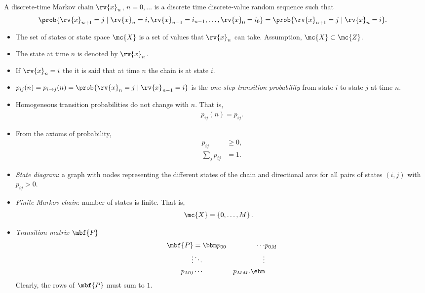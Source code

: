 \begin{definitionBox}
    A discrete-time Markov chain  $\rv{x}_{n}$, $n=0,\ldots$ is a discrete time discrete-value random sequence such that
    \begin{align}
        \prob{\rv{x}_{n+1}=j\mid \rv{x}_{n}=i,\rv{x}_{n-1}=i_{n-1},\ldots, \rv{x}_{0}=i_{0}} &=
        \prob{\rv{x}_{n+1}=j\mid \rv{x}_{n}=i}.
    \end{align}
\end{definitionBox}
\begin{remarkBox}[Terminology]
    \begin{itemize}
        \item The set of states or state space $\mc{X}$ is a set of values that $\rv{x}_{n}$ can take. Assumption, $\mc{X}\subset\mc{Z}$.
        \item The state at time $n$ is denoted by $\rv{x}_{n}$.
        \item If $\rv{x}_{n}=i$ the it is said that at time $n$ the chain is at state $i$.

        \item $p_{ij}(n)=p_{i\to j}(n) = \prob{\rv{x}_{n}=j\mid \rv{x}_{n-1}=i}$ is the \emph{one-step transition probability} from state $i$ to state $j$ at time $n$.
        \item Homogeneous transition probabilities do not change with $n$. That is,
        \begin{align}
            p_{ij}(n) = p_{ij}.
        \end{align}
        \item From the axioms of probability,
        \begin{align}
            p_{ij}&\geq 0, \\
            \sum_{j} p_{ij} &= 1.
        \end{align}
        \item \emph{State diagram}: a graph with nodes representing the different states of the chain and directional arcs for all pairs of states $(i,j)$ with $p_{ij}>0$.
        \item \emph{Finite Markov chain}: number of states is finite. That is,
        \begin{align}
            \mc{X} &= \left\{ 0, \ldots, M \right\}.
        \end{align}
        \item \emph{Transition matrix} $\mbf{P}$
        \begin{align}
            \mbf{P}&=
            \bbm p_{00} & \cdots & p_{0M}\\
            \vdots & \ddots & \vdots\\
            p_{M0} & \cdots & p_{MM}.
             \ebm
        \end{align}
        Clearly, the rows of $\mbf{P}$ must sum to $1$.
    \end{itemize}
\end{remarkBox}

